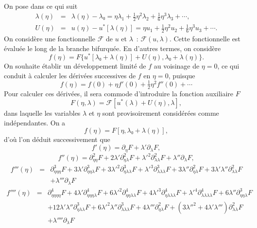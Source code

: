 \documentclass{article}
\begin{document}
On pose dans ce qui suit
\begin{eqnarray}
  λ (η) & = & λ (η) - λ₀ = η λ_1 +
  \tfrac{1}{2} η^2 λ_2 + \tfrac{1}{6} η^3 λ_3 + \cdots,
  \label{eq20211112155446}\\
  U (η) & = & u (η) - u^{\ast} [λ (η)] = η u_1 +
  \tfrac{1}{2} η^2 u_2 + \tfrac{1}{6} η^3 u_3 + \cdots .
  \label{eq20211112113028}
\end{eqnarray}
On considère une fonctionnelle $\mathcal{F}$ de $u$ et $λ$~:
$\mathcal{F} (u, λ)$. Cette fonctionnelle est évaluée le long de
la branche bifurquée. En d'autres termes, on considère
\begin{equation}
  f (η) = F \{ u^{\ast} [λ₀ + λ (η)] + U (η), λ₀
  + λ (η) \} .
\end{equation}
On souhaite établir un développement limité de $f$ au voisinage de
$η = 0$, ce qui conduit à calculer les dérivées successives de
$f$ en $η = 0$, puisque
\begin{equation}
  f (η) = f (0) + η f' (0) + \tfrac{1}{2} η^2 f'' (0) + \cdots
\end{equation}
Pour calculer ces dérivées, il sera commode d'introduire la fonction
auxiliaire $F$
\begin{equation}
  F (η, λ) =\mathcal{F} [u^{\ast} (λ) + U (η), λ],
\end{equation}
dans laquelle les variables $λ$ et $η$ sont provisoirement
considérées comme indépendantes. On a
\begin{equation}
  f (η) = F [η, λ₀ + λ (η)],
\end{equation}
d'où l'on déduit successivement que
\begin{equation}
  \label{eq20211112162417} f' (η) = \partial_{η} F + λ'
  \partial_{λ} F,
\end{equation}
\begin{equation}
  \label{eq20211112165810} f'' (η) = \partial_{η  η}^2 F + 2
  λ' \partial_{η  λ}^2 {F + λ'}^2
  \partial_{λ  λ}^2 F + λ'' \partial_{λ} F,
\end{equation}
\begin{eqnarray}
  \label{eq20211112173223} f''' (η) & = & \partial_{η  η
   η}^3 F + 3 λ' \partial_{η  η
  λ}^3 {F + 3 λ'}^2 \partial_{η  λ
  λ}^3 {F + λ'}^3 \partial_{λ  λ
  λ}^3 F + 3 λ'' \partial_{η  λ}^2 F + 3 λ'
  λ'' \partial_{λ  λ}^2 F \nonumber\\
  &  &  + λ''' \partial_{λ} F
\end{eqnarray}
\begin{eqnarray}
  f'''' (η) & = & \partial_{η  η  η
  η}^4 F + 4 λ' \partial_{η  η  η
  λ}^4 {F + 6 λ'}^2 \partial_{η  η  λ
   λ}^4 {F + 4 λ'}^3 \partial_{η  λ
   λ  λ}^4 {F + λ'}^4 \partial_{λ
   λ  λ  λ}^4 F + 6 λ''
  \partial_{η  η  λ}^3 F \nonumber\\
  &  & + 12 λ' λ'' \partial_{η  λ
  λ}^3 {F + 6 λ'}^2 λ'' \partial_{λ  λ
   λ}^3 F + 4 λ''' \partial_{η  λ}^2 F +
  \left( {3 λ''}^2 + 4 λ' λ''' \right) \partial_{λ
   λ}^2 F \\
  &  & + λ'''' \partial_{λ} F
\end{eqnarray}
\end{document}
